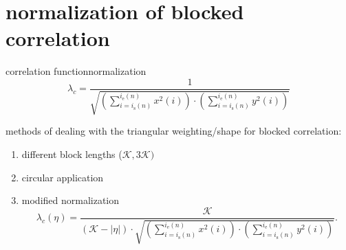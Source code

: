     \section[normalization]{normalization of blocked correlation}
        \begin{frame}{correlation function}{normalization}
        \vspace{-3mm}
            \begin{equation*}\label{eq:corrnorm}
                \lambda_c = \frac{1}{\sqrt{\left(\sum\limits_{i=i_{\mathrm{s}}(n)}^{i_{\mathrm{e}}(n)}{x^2(i)}\right)\cdot \left(\sum\limits_{i=i_{\mathrm{s}}(n)}^{i_{\mathrm{e}}(n)}{y^2(i)}\right)}} 
            \end{equation*}
            
            \bigskip
            methods of dealing with the triangular weighting/shape for blocked correlation:
            \begin{enumerate}
                \item<2->	different block lengths ($\mathcal{K},3\mathcal{K})$
                \item<2->	circular application
                \item<2->	modified normalization
                    \begin{equation*}
                        \lambda_c(\eta) = \frac{\mathcal{K}}{(\mathcal{K}-|\eta|)\cdot\sqrt{\left(\sum\limits_{i=i_{\mathrm{s}}(n)}^{i_{\mathrm{e}}(n)}{x^2(i)}\right)\cdot \left(\sum\limits_{i=i_{\mathrm{s}}(n)}^{i_{\mathrm{e}}(n)}{y^2(i)}\right)}} .
                    \end{equation*}
            \end{enumerate}
        \end{frame}	


